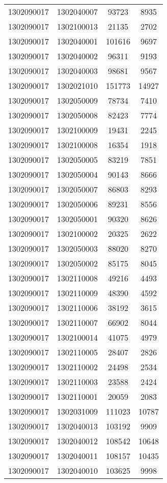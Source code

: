 \begin{longtable}{llcc}
1302090017 & 1302040007 & 93723 & 8935\\
1302090017 & 1302100013 & 21135 & 2702\\
1302090017 & 1302040001 & 101616 & 9697\\
1302090017 & 1302040002 & 96311 & 9193\\
1302090017 & 1302040003 & 98681 & 9567\\
1302090017 & 1302021010 & 151773 & 14927\\
1302090017 & 1302050009 & 78734 & 7410\\
1302090017 & 1302050008 & 82423 & 7774\\
1302090017 & 1302100009 & 19431 & 2245\\
1302090017 & 1302100008 & 16354 & 1918\\
1302090017 & 1302050005 & 83219 & 7851\\
1302090017 & 1302050004 & 90143 & 8666\\
1302090017 & 1302050007 & 86803 & 8293\\
1302090017 & 1302050006 & 89231 & 8556\\
1302090017 & 1302050001 & 90320 & 8626\\
1302090017 & 1302100002 & 20325 & 2622\\
1302090017 & 1302050003 & 88020 & 8270\\
1302090017 & 1302050002 & 85175 & 8045\\
1302090017 & 1302110008 & 49216 & 4493\\
1302090017 & 1302110009 & 48390 & 4592\\
1302090017 & 1302110006 & 38192 & 3615\\
1302090017 & 1302110007 & 66902 & 8044\\
1302090017 & 1302100014 & 41075 & 4979\\
1302090017 & 1302110005 & 28407 & 2826\\
1302090017 & 1302110002 & 24498 & 2534\\
1302090017 & 1302110003 & 23588 & 2424\\
1302090017 & 1302110001 & 20059 & 2083\\
1302090017 & 1302031009 & 111023 & 10787\\
1302090017 & 1302040013 & 103192 & 9909\\
1302090017 & 1302040012 & 108542 & 10648\\
1302090017 & 1302040011 & 108157 & 10435\\
1302090017 & 1302040010 & 103625 & 9998\\

\end{longtable}
